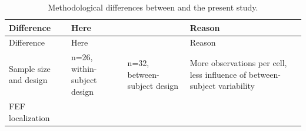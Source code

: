 \documentclass[11pt,]{memoir}
\begin{document}
\begin{longtable}[]{@{}llll@{}}
\caption{\label{tab:differences} Methodological differences between \textcite{Kanai2012} and the present study.}\tabularnewline
\toprule
\begin{minipage}[b]{0.14\columnwidth}\raggedright
Difference\strut
\end{minipage} & \begin{minipage}[b]{0.21\columnwidth}\raggedright
Here\strut
\end{minipage} & \begin{minipage}[b]{0.16\columnwidth}\raggedright
\textcite{Kanai2012}\strut
\end{minipage} & \begin{minipage}[b]{0.38\columnwidth}\raggedright
Reason\strut
\end{minipage}\tabularnewline
\midrule
\endfirsthead
\toprule
\begin{minipage}[b]{0.14\columnwidth}\raggedright
Difference\strut
\end{minipage} & \begin{minipage}[b]{0.21\columnwidth}\raggedright
Here\strut
\end{minipage} & \begin{minipage}[b]{0.16\columnwidth}\raggedright
\textcite{Kanai2012}\strut
\end{minipage} & \begin{minipage}[b]{0.38\columnwidth}\raggedright
Reason\strut
\end{minipage}\tabularnewline
\midrule
\endhead
\begin{minipage}[t]{0.14\columnwidth}\raggedright
Sample size and design\strut
\end{minipage} & \begin{minipage}[t]{0.21\columnwidth}\raggedright
n=26, within-subject design\strut
\end{minipage} & \begin{minipage}[t]{0.16\columnwidth}\raggedright
n=32, between-subject design\strut
\end{minipage} & \begin{minipage}[t]{0.38\columnwidth}\raggedright
More observations per cell, less influence of between-subject variability\strut
\end{minipage}\tabularnewline
\begin{minipage}[t]{0.14\columnwidth}\raggedright
FEF localization\strut
\end{minipage} & \begin{minipage}[t]{0.21\columnwidth}\raggedright

\end{minipage}
\end{longtable}
\end{document}
